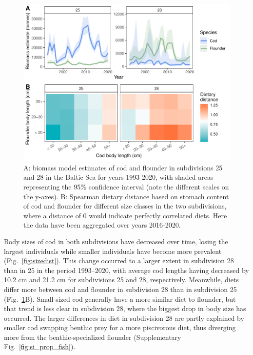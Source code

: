 \documentclass[9pt,twocolumn,twoside]{pnas-new}
\begin{document}
\begin{figure}%
\centering
\includegraphics[width=1\linewidth]{fig3.pdf}
\caption{A: biomass model estimates of cod and flounder in subdivisions 25 and 28 in the Baltic Sea for years 1993-2020, with shaded areas representing the 95\% confidence interval (note the different scales on the y-axes). B: Spearman dietary distance based on stomach content of cod and flounder for different size classes in the two subdivisions, where a distance of 0 would indicate perfectly correlated diets. Here the data have been aggregated over years 2016-2020.}
\label{fig:biomass_diet}
\end{figure}

Body sizes of cod in both subdivisions have decreased over time, losing the largest individuals while smaller individuals have become more prevalent (Fig.~\ref{fig:sizedist}). This change occurred to a larger extent in subdivision 28 than in 25 in the period 1993--2020, with average cod lengths having decreased by 10.2 cm and 21.2 cm for subdivisions 25 and 28, respectively. Meanwhile, diets differ more between cod and flounder in subdivision 28 than in subdivision 25 (Fig.~\ref{fig:biomass_diet}B). Small-sized cod generally have a more similar diet to flounder, but that trend is less clear in subdivision 28, where the biggest drop in body size has occurred. The larger differences in diet in subdivision 28 are partly explained by smaller cod swapping benthic prey for a more piscivorous diet, thus diverging more from the benthic-specialized flounder (Supplementary Fig.~\ref{fig:si_prop_fish}).
\end{document}

